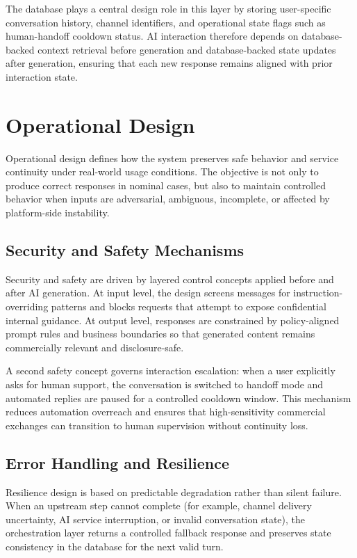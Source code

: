 The database plays a central design role in this layer by storing user-specific conversation history, channel identifiers, and operational state flags such as human-handoff cooldown status. AI interaction therefore depends on database-backed context retrieval before generation and database-backed state updates after generation, ensuring that each new response remains aligned with prior interaction state.

\section{Operational Design}
Operational design defines how the system preserves safe behavior and service continuity under real-world usage conditions. The objective is not only to produce correct responses in nominal cases, but also to maintain controlled behavior when inputs are adversarial, ambiguous, incomplete, or affected by platform-side instability.

\subsection{Security and Safety Mechanisms}
Security and safety are driven by layered control concepts applied before and after AI generation. At input level, the design screens messages for instruction-overriding patterns and blocks requests that attempt to expose confidential internal guidance. At output level, responses are constrained by policy-aligned prompt rules and business boundaries so that generated content remains commercially relevant and disclosure-safe.

A second safety concept governs interaction escalation: when a user explicitly asks for human support, the conversation is switched to handoff mode and automated replies are paused for a controlled cooldown window. This mechanism reduces automation overreach and ensures that high-sensitivity commercial exchanges can transition to human supervision without continuity loss.

\subsection{Error Handling and Resilience}
Resilience design is based on predictable degradation rather than silent failure. When an upstream step cannot complete (for example, channel delivery uncertainty, AI service interruption, or invalid conversation state), the orchestration layer returns a controlled fallback response and preserves state consistency in the database for the next valid turn.


